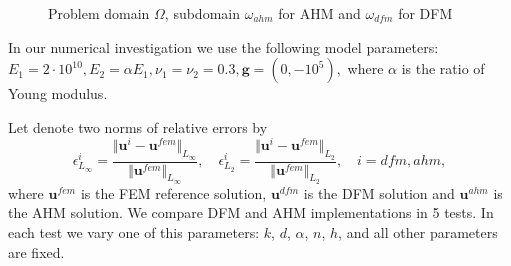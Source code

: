 \documentclass[a4paper]{jpconf}
\begin{document}
\begin{figure}[H]
    \centering
    \caption{Problem domain $\Omega$, subdomain $\omega_{ahm}$ for AHM and $\omega_{dfm}$ for DFM}
    \label{fig:domain}
\end{figure}

In our numerical investigation we use the following model parameters:
$E_1 = 2\cdot10^{10}, E_2 = \alpha E_1, \nu_1 = \nu_2 = 0.3, \bm{g} = (0, -10^5),$
where $\alpha$ is the ratio of Young modulus. 

Let denote two norms of relative errors by
\[
    \epsilon^{i}_{L_\infty} = \frac{\Vert \bm{u}^{i} - \bm{u}^{fem} \Vert_{L_\infty}}{\Vert \bm{u}^{fem} \Vert_{L_\infty}}, \quad
    \epsilon^{i}_{L_2} = \frac{\Vert \bm{u}^{i} - \bm{u}^{fem} \Vert_{L_2}}{\Vert \bm{u}^{fem} \Vert_{L_2}}, \quad
    i = dfm, ahm, 
\]
where $\bm{u}^{fem}$ is the FEM reference solution, $\bm{u}^{dfm}$ is the DFM solution and $\bm{u}^{ahm}$ is the AHM solution.
We compare DFM and AHM implementations in 5 tests. In each test we vary one of this parameters: $k$, $d$, $\alpha$, $n$, $h$, and all other parameters are fixed.
\end{document}
